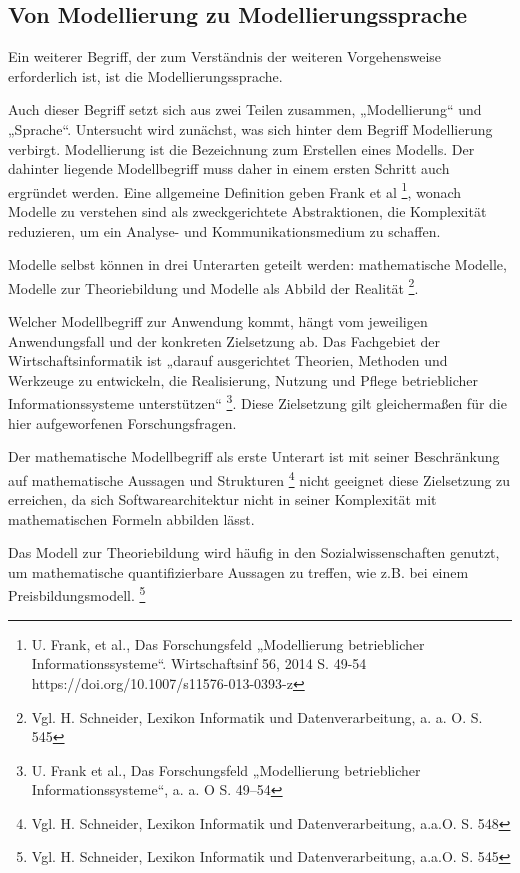 \subsection{ Von Modellierung zu Modellierungssprache}

Ein weiterer Begriff, der zum Verständnis der weiteren Vorgehensweise erforderlich ist, ist die Modellierungssprache. 	

Auch dieser Begriff setzt sich aus zwei Teilen zusammen, „Modellierung“ und „Sprache“.
Untersucht wird zunächst, was sich hinter dem Begriff Modellierung verbirgt. Modellierung ist die Bezeichnung zum Erstellen eines Modells. Der dahinter liegende Modellbegriff muss daher in einem ersten Schritt auch ergründet werden. Eine allgemeine Definition geben Frank et al \footnote{U. Frank, et al., Das Forschungsfeld „Modellierung betrieblicher Informationssysteme“. Wirtschaftsinf 56, 2014 S. 49-54 https://doi.org/10.1007/s11576-013-0393-z}, wonach Modelle zu verstehen sind als zweckgerichtete Abstraktionen, die Komplexität reduzieren, um ein Analyse- und Kommunikationsmedium zu schaffen.

Modelle selbst können in drei Unterarten geteilt werden: mathematische Modelle, Modelle zur Theoriebildung und Modelle als Abbild der Realität \footnote{Vgl. H. Schneider, Lexikon Informatik und Datenverarbeitung, a. a. O. S. 545 }.

Welcher Modellbegriff zur Anwendung kommt, hängt vom jeweiligen Anwendungsfall und der konkreten Zielsetzung ab. Das Fachgebiet der Wirtschaftsinformatik ist „darauf ausgerichtet Theorien, Methoden und Werkzeuge zu entwickeln, die Realisierung, Nutzung und Pflege betrieblicher Informationssysteme unterstützen“ \footnote{U. Frank et al., Das Forschungsfeld „Modellierung betrieblicher Informationssysteme“, a. a. O S. 49–54 }.
Diese Zielsetzung gilt gleichermaßen für die hier aufgeworfenen Forschungsfragen. 

Der mathematische Modellbegriff als erste Unterart ist mit seiner Beschränkung auf mathematische Aussagen und Strukturen \footnote{Vgl. H. Schneider, Lexikon Informatik und Datenverarbeitung, a.a.O. S. 548}  nicht geeignet diese Zielsetzung zu erreichen, da sich Softwarearchitektur nicht in seiner Komplexität mit mathematischen Formeln abbilden lässt.
 
Das Modell zur Theoriebildung wird häufig in den Sozialwissenschaften genutzt, um mathematische quantifizierbare Aussagen zu treffen, wie z.B. bei einem Preisbildungsmodell.
\footnote{Vgl. H. Schneider, Lexikon Informatik und Datenverarbeitung, a.a.O. S. 545}

